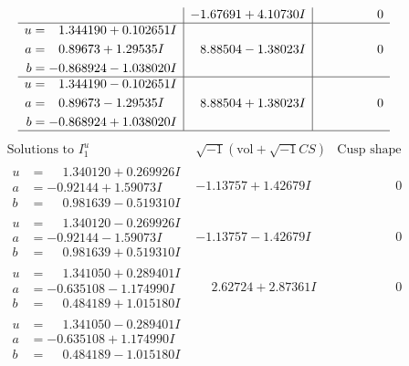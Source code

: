 \documentclass[1p]{elsarticle_modified}
\theoremstyle{definition}
\newcommand{\I}{\sqrt{-1}}
\begin{document}
$$\begin{array}{c|c|c}
 & -1.67691 + 4.10730 I & \phantom{-0.000000 } 0 \\ \hline\begin{aligned}
u &= \phantom{-}1.344190 + 0.102651 I \\
a &= \phantom{-}0.89673 + 1.29535 I \\
b &= -0.868924 - 1.038020 I\end{aligned}
 & \phantom{-}8.88504 - 1.38023 I & \phantom{-0.000000 } 0 \\ \hline\begin{aligned}
u &= \phantom{-}1.344190 - 0.102651 I \\
a &= \phantom{-}0.89673 - 1.29535 I \\
b &= -0.868924 + 1.038020 I\end{aligned}
 & \phantom{-}8.88504 + 1.38023 I & \phantom{-0.000000 } 0\\
 \hline 
 \end{array}$$\newpage$$\begin{array}{c|c|c}  
\text{Solutions to }I^u_{1}& \I (\text{vol} + \sqrt{-1}CS) & \text{Cusp shape}\\
 \hline 
\begin{aligned}
u &= \phantom{-}1.340120 + 0.269926 I \\
a &= -0.92144 + 1.59073 I \\
b &= \phantom{-}0.981639 - 0.519310 I\end{aligned}
 & -1.13757 + 1.42679 I & \phantom{-0.000000 } 0 \\ \hline\begin{aligned}
u &= \phantom{-}1.340120 - 0.269926 I \\
a &= -0.92144 - 1.59073 I \\
b &= \phantom{-}0.981639 + 0.519310 I\end{aligned}
 & -1.13757 - 1.42679 I & \phantom{-0.000000 } 0 \\ \hline\begin{aligned}
u &= \phantom{-}1.341050 + 0.289401 I \\
a &= -0.635108 - 1.174990 I \\
b &= \phantom{-}0.484189 + 1.015180 I\end{aligned}
 & \phantom{-}2.62724 + 2.87361 I & \phantom{-0.000000 } 0 \\ \hline\begin{aligned}
u &= \phantom{-}1.341050 - 0.289401 I \\
a &= -0.635108 + 1.174990 I \\
b &= \phantom{-}0.484189 - 1.015180 I\end{aligned}

\end{array}$$
\end{document}
